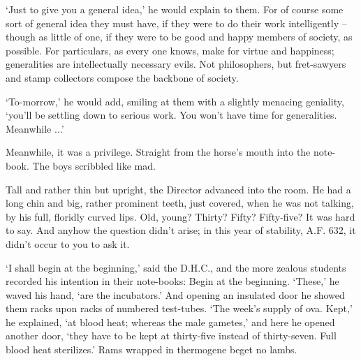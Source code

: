 \documentclass[12pt,a5paper]{book}
\newcommand{\sqm}[1]{‘#1’}
\begin{document}
\sqm{Just to give you a general idea,} he would explain to them. For of course some sort of general idea they must have, if they were to do their work intelligently – though as little of one, if they were to be good and happy members of society, as possible. For particulars, as every one knows, make for virtue and happiness; generalities are intellectually necessary evils. Not philosophers, but fret-sawyers and stamp collectors compose the backbone of society.

\sqm{To-morrow,} he would add, smiling at them with a slightly menacing geniality, \sqm{you'll be settling down to serious work. You won't have time for generalities. Meanwhile ...}

Meanwhile, it was a privilege. Straight from the horse's mouth into the note-book. The boys scribbled like mad.

Tall and rather thin but upright, the Director advanced into the room. He had a long chin and big, rather prominent teeth, just covered, when he was not talking, by his full, floridly curved lips. Old, young? Thirty? Fifty? Fifty-five? It was hard to say. And anyhow the question didn't arise; in this year of stability, A.F. 632, it didn't occur to you to ask it.

\sqm{I shall begin at the beginning,} said the D.H.C., and the more zealous students recorded his intention in their note-books: Begin at the beginning. \sqm{These,} he waved his hand, \sqm{are the incubators.} And opening an insulated door he showed them racks upon racks of numbered test-tubes. \sqm{The week's supply of ova. Kept,} he explained, \sqm{at blood heat; whereas the male gametes,} and here he opened another door, \sqm{they have to be kept at thirty-five instead of thirty-seven. Full blood heat sterilizes.} Rams wrapped in thermogene beget no lambs.
\end{document}
